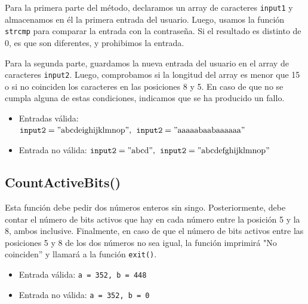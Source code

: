 \documentclass[11pt,a4paper]{article}
\begin{document}
Para la primera parte del método, declaramos un array de caracteres \texttt{input1} y almacenamos en él la primera entrada del usuario. Luego, usamos la función \texttt{strcmp} para comparar la entrada con la contraseña. Si el resultado es distinto de 0, es que son diferentes, y prohibimos la entrada.

Para la segunda parte, guardamos la nueva entrada del usuario en el array de caracteres \texttt{input2}. Luego, comprobamos si la longitud del array es menor que 15 o si no coinciden los caracteres en las posiciones 8 y 5. En caso de que no se cumpla alguna de estas condiciones, indicamos que se ha producido un fallo.

\begin{itemize}
  \item Entradas válida: \(\texttt{input2} = \text{''abcdeighijklmnop''}, \hspace{1.5mm} \texttt{input2} = \text{''aaaaabaabaaaaaa''}\)
  \item Entrada no válida: \(\texttt{input2} = \text{''abcd''}, \hspace{1.5mm} \texttt{input2} = \text{''abcdefghijklmnop''}\)
\end{itemize}
\subsection{CountActiveBits()}
Esta función debe pedir dos números enteros sin singo. Posteriormente, debe contar el número de bits activos
que hay en cada número entre la posición 5 y la 8, ambos inclusive. Finalmente, en caso de que el 
número de bits activos entre las posiciones 5 y 8 de los dos números   no sea igual, la función 
imprimirá "No coinciden'' y llamará a la función \texttt{exit()}.
\begin{itemize}
  \item Entrada válida: \texttt{a = 352, b = 448}
  \item Entrada no válida: \texttt{a = 352, b = 0}
\end{itemize}
\end{document}
